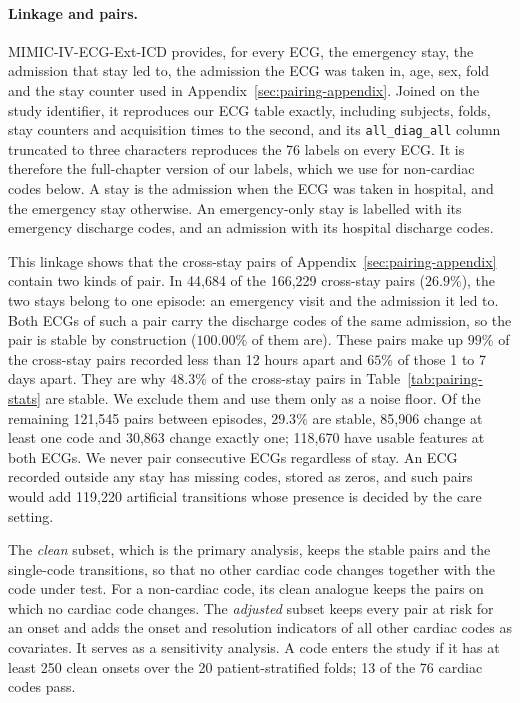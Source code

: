 \paragraph{Linkage and pairs.} MIMIC-IV-ECG-Ext-ICD provides, for every ECG, the emergency stay, the admission that stay led to, the admission the ECG was taken in, age, sex, fold and the stay counter used in Appendix~\ref{sec:pairing-appendix}. Joined on the study identifier, it reproduces our ECG table exactly, including subjects, folds, stay counters and acquisition times to the second, and its \texttt{all\_diag\_all} column truncated to three characters reproduces the 76 labels on every ECG. It is therefore the full-chapter version of our labels, which we use for non-cardiac codes below. A stay is the admission when the ECG was taken in hospital, and the emergency stay otherwise. An emergency-only stay is labelled with its emergency discharge codes, and an admission with its hospital discharge codes.

This linkage shows that the cross-stay pairs of Appendix~\ref{sec:pairing-appendix} contain two kinds of pair. In 44{,}684 of the 166{,}229 cross-stay pairs ($26.9\%$), the two stays belong to one episode: an emergency visit and the admission it led to. Both ECGs of such a pair carry the discharge codes of the same admission, so the pair is stable by construction ($100.00\%$ of them are). These pairs make up $99\%$ of the cross-stay pairs recorded less than 12 hours apart and $65\%$ of those 1 to 7 days apart. They are why $48.3\%$ of the cross-stay pairs in Table~\ref{tab:pairing-stats} are stable. We exclude them and use them only as a noise floor. Of the remaining 121{,}545 pairs between episodes, $29.3\%$ are stable, 85{,}906 change at least one code and 30{,}863 change exactly one; 118{,}670 have usable features at both ECGs. We never pair consecutive ECGs regardless of stay. An ECG recorded outside any stay has missing codes, stored as zeros, and such pairs would add 119{,}220 artificial transitions whose presence is decided by the care setting.

The \emph{clean} subset, which is the primary analysis, keeps the stable pairs and the single-code transitions, so that no other cardiac code changes together with the code under test. For a non-cardiac code, its clean analogue keeps the pairs on which no cardiac code changes. The \emph{adjusted} subset keeps every pair at risk for an onset and adds the onset and resolution indicators of all other cardiac codes as covariates. It serves as a sensitivity analysis. A code enters the study if it has at least 250 clean onsets over the 20 patient-stratified folds; 13 of the 76 cardiac codes pass.

